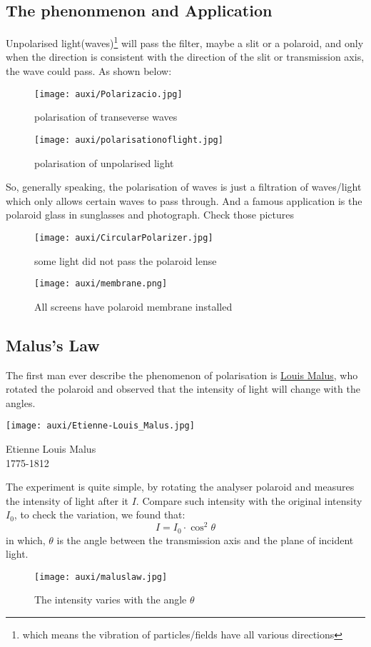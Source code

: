 \documentclass[a4paper]{tufte-handout}
\begin{document}
\subsection{The phenonmenon and Application}
Unpolarised light(waves)\footnote{which means the vibration of particles/fields have all various directions} will pass the filter, maybe a slit or a polaroid, and only when the direction is consistent with the direction of the slit or transmission axis, the wave could pass. As shown below:
\begin{figure}[h]
\texttt{[image: auxi/Polarizacio.jpg]}
\caption{polarisation of transeverse waves}
\end{figure}

\begin{figure}[h]
\texttt{[image: auxi/polarisationoflight.jpg]}
\caption{polarisation of unpolarised light}
\end{figure}

So, generally speaking, the polarisation of waves is just a filtration of waves/light which only allows certain waves to pass through. And a famous application is the polaroid glass in sunglasses and photograph. Check those pictures
\begin{figure}[h]
\texttt{[image: auxi/CircularPolarizer.jpg]}
\caption{some light did not pass the polaroid lense}
\end{figure}

\begin{figure}[h]
\texttt{[image: auxi/membrane.png]}
\caption{All screens have polaroid membrane installed}
\end{figure}

\subsection{Malus's Law}
The first man ever describe the phenomenon of polarisation is \href{https://en.wikipedia.org/wiki/Étienne-Louis_Malus}{Louis Malus}, who rotated the polaroid and observed that the intensity of light will change with the angles.
\begin{marginfigure}[-5cm]
\texttt{[image: auxi/Etienne-Louis\_Malus.jpg]}
\caption{Etienne Louis Malus\\1775-1812}
\end{marginfigure}

The experiment is quite simple, by rotating the analyser polaroid and measures the intensity of light after it $I$. Compare such intensity with the original intensity $I_0$, to check the variation, we found that:
\begin{equation}
 I = I_0 \cdot \cos^2 \theta
\end{equation}
in which, $\theta$ is the angle between the transmission axis and the plane of incident light.
\begin{figure}[h]
\centering
\texttt{[image: auxi/maluslaw.jpg]}
\caption{The intensity varies with the angle $\theta$}
\end{figure}
\end{document}
